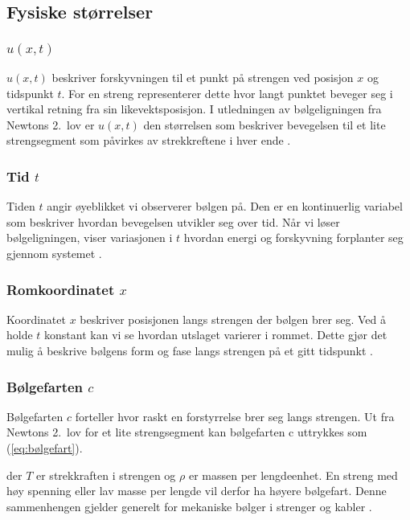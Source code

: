 \subsection{Fysiske størrelser}

\subsubsection{\texorpdfstring{$u(x,t)$}{u(x,t)}}
$u(x,t)$ beskriver forskyvningen til et punkt på strengen ved posisjon $x$ og tidspunkt $t$. 
For en streng representerer dette hvor langt punktet beveger seg i vertikal retning fra sin likevektsposisjon. 
I utledningen av bølgeligningen fra Newtons 2.\ lov er $u(x,t)$ den størrelsen som beskriver bevegelsen til et lite strengsegment som påvirkes av strekkreftene i hver ende \parencite{LamarVibratingString}.

\subsubsection{Tid \texorpdfstring{$t$}{t}}
Tiden $t$ angir øyeblikket vi observerer bølgen på. 
Den er en kontinuerlig variabel som beskriver hvordan bevegelsen utvikler seg over tid. 
Når vi løser bølgeligningen, viser variasjonen i $t$ hvordan energi og forskyvning forplanter seg gjennom systemet \parencite{LamarWaveEquationSection}.

\subsubsection{Romkoordinatet \texorpdfstring{$x$}{x}}
Koordinatet $x$ beskriver posisjonen langs strengen der bølgen brer seg. 
Ved å holde $t$ konstant kan vi se hvordan utslaget varierer i rommet. 
Dette gjør det mulig å beskrive bølgens form og fase langs strengen på et gitt tidspunkt \parencite{UBCWaveSeparation}.

\subsubsection{Bølgefarten \texorpdfstring{$c$}{c}}
Bølgefarten $c$ forteller hvor raskt en forstyrrelse brer seg langs strengen. 
Ut fra Newtons 2.\ lov for et lite strengsegment kan bølgefarten c uttrykkes som (\ref{eq:bølgefart}).

der $T$ er strekkraften i strengen og $\rho$ er massen per lengdeenhet. 
En streng med høy spenning eller lav masse per lengde vil derfor ha høyere bølgefart. 
Denne sammenhengen gjelder generelt for mekaniske bølger i strenger og kabler \parencite{LibreTextsWaveSpeed}.

